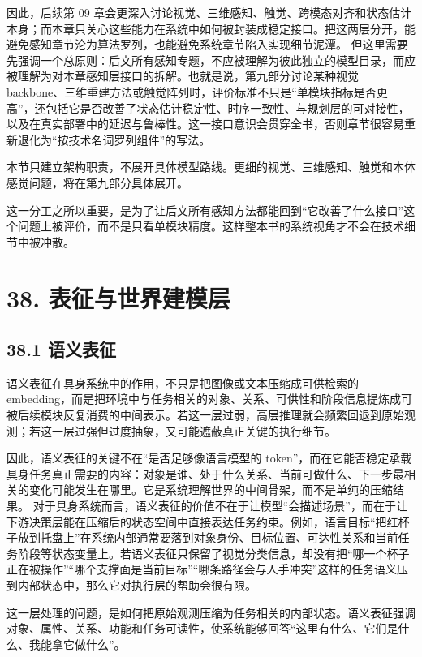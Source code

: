 因此，后续第 09 章会更深入讨论视觉、三维感知、触觉、跨模态对齐和状态估计本身；而本章只关心这些能力在系统中如何被封装成稳定接口。把这两层分开，能避免感知章节沦为算法罗列，也能避免系统章节陷入实现细节泥潭。 但这里需要先强调一个总原则：后文所有感知专题，不应被理解为彼此独立的模型目录，而应被理解为对本章感知层接口的拆解。也就是说，第九部分讨论某种视觉 backbone、三维重建方法或触觉阵列时，评价标准不只是“单模块指标是否更高”，还包括它是否改善了状态估计稳定性、时序一致性、与规划层的可对接性，以及在真实部署中的延迟与鲁棒性。这一接口意识会贯穿全书，否则章节很容易重新退化为“按技术名词罗列组件”的写法。

本节只建立架构职责，不展开具体模型路线。更细的视觉、三维感知、触觉和本体感觉问题，将在第九部分具体展开。

这一分工之所以重要，是为了让后文所有感知方法都能回到“它改善了什么接口”这个问题上被评价，而不是只看单模块精度。这样整本书的系统视角才不会在技术细节中被冲散。

\section*{38. 表征与世界建模层}

\subsection*{38.1 语义表征}


语义表征在具身系统中的作用，不只是把图像或文本压缩成可供检索的 embedding，而是把环境中与任务相关的对象、关系、可供性和阶段信息提炼成可被后续模块反复消费的中间表示。若这一层过弱，高层推理就会频繁回退到原始观测；若这一层过强但过度抽象，又可能遮蔽真正关键的执行细节。

因此，语义表征的关键不在“是否足够像语言模型的 token”，而在它能否稳定承载具身任务真正需要的内容：对象是谁、处于什么关系、当前可做什么、下一步最相关的变化可能发生在哪里。它是系统理解世界的中间骨架，而不是单纯的压缩结果。 对于具身系统而言，语义表征的价值不在于让模型“会描述场景”，而在于让下游决策层能在压缩后的状态空间中直接表达任务约束。例如，语言目标“把红杯子放到托盘上”在系统内部通常要落到对象身份、目标位置、可达性关系和当前任务阶段等状态变量上。若语义表征只保留了视觉分类信息，却没有把“哪一个杯子正在被操作”“哪个支撑面是当前目标”“哪条路径会与人手冲突”这样的任务语义压到内部状态中，那么它对执行层的帮助会很有限。

这一层处理的问题，是如何把原始观测压缩为任务相关的内部状态。语义表征强调对象、属性、关系、功能和任务可读性，使系统能够回答“这里有什么、它们是什么、我能拿它做什么”。

